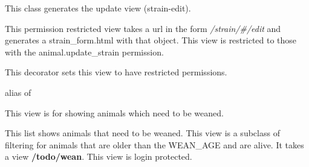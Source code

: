 \documentclass[letterpaper,10pt,english]{sphinxmanual}
\begin{document}
\begin{fulllineitems}
\label{animals:mousedb.animal.views.StrainUpdate}
This class generates the update {\hyperref[animals:mousedb.animal.models.Strain]{}} view (strain-edit).

This permission restricted view takes a url in the form \emph{/strain/\#/edit} and generates a strain\_form.html with that object.
This view is restricted to those with the animal.update\_strain permission.

\begin{fulllineitems}
\label{animals:mousedb.animal.views.StrainUpdate.dispatch}
This decorator sets this view to have restricted permissions.

\end{fulllineitems}


\begin{fulllineitems}
\label{animals:mousedb.animal.views.StrainUpdate.model}
alias of 

\end{fulllineitems}


\end{fulllineitems}


\begin{fulllineitems}
\label{animals:mousedb.animal.views.WeanList}
This view is for showing animals which need to be weaned.

This list shows animals that need to be weaned.  
This view is a subclass of {\hyperref[animals:mousedb.animal.views.AnimalList]{}} filtering for animals that are older than the WEAN\_AGE and are alive.
It takes a view \textbf{/todo/wean}.
This view is login protected.

\end{fulllineitems}

\end{document}
